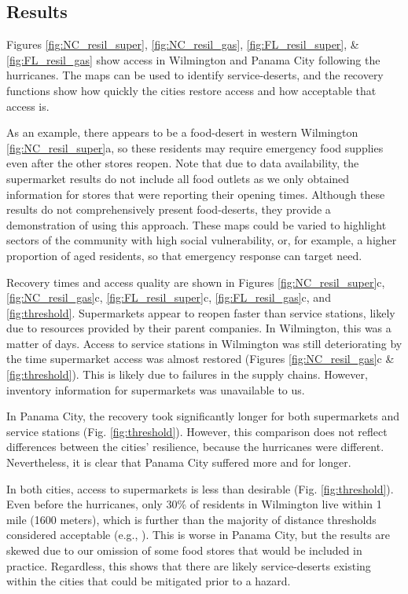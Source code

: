 \documentclass[onecolumn,doublespacing]{risa}
\let \citeA \textcite
\begin{document}
\subsection{Results}
Figures \ref{fig:NC_resil_super}, \ref{fig:NC_resil_gas}, \ref{fig:FL_resil_super}, \& \ref{fig:FL_resil_gas} show access in Wilmington and Panama City following the hurricanes. 
The maps can be used to identify service-deserts, and the recovery functions show how quickly the cities restore access and how acceptable that access is.

As an example, there appears to be a food-desert in western Wilmington \ref{fig:NC_resil_super}a, so these residents may require emergency food supplies even after the other stores reopen.
Note that due to data availability, the supermarket results do not include all food outlets as we only obtained information for stores that were reporting their opening times.
Although these results do not comprehensively present food-deserts, they provide a demonstration of using this approach.
These maps could be varied to highlight sectors of the community with high social vulnerability, or, for example, a higher proportion of aged residents, so that emergency response can target need.

Recovery times and access quality are shown in Figures \ref{fig:NC_resil_super}c, \ref{fig:NC_resil_gas}c, \ref{fig:FL_resil_super}c, \ref{fig:FL_resil_gas}c, and \ref{fig:threshold}. 
Supermarkets appear to reopen faster than service stations, likely due to resources provided by their parent companies.
In Wilmington, this was a matter of days.
Access to service stations in Wilmington was still deteriorating by the time supermarket access was almost restored (Figures \ref{fig:NC_resil_gas}c \& \ref{fig:threshold}).
This is likely due to failures in the supply chains.
However, inventory information for supermarkets was unavailable to us.

In Panama City, the recovery took significantly longer for both supermarkets and service stations (Fig. \ref{fig:threshold}).
However, this comparison does not reflect differences between the cities' resilience, because the hurricanes were different. 
Nevertheless, it is clear that Panama City suffered more and for longer.

In both cities, access to supermarkets is less than desirable (Fig. \ref{fig:threshold}).
Even before the hurricanes, only 30\% of residents in Wilmington live within 1 mile (1600 meters), which is further than the majority of distance thresholds considered acceptable (e.g., \citeA{Talen2003-dc}).
This is worse in Panama City, but the results are skewed due to our omission of some food stores that would be included in practice.
Regardless, this shows that there are likely service-deserts existing within the cities that could be mitigated prior to a hazard.
\end{document}
